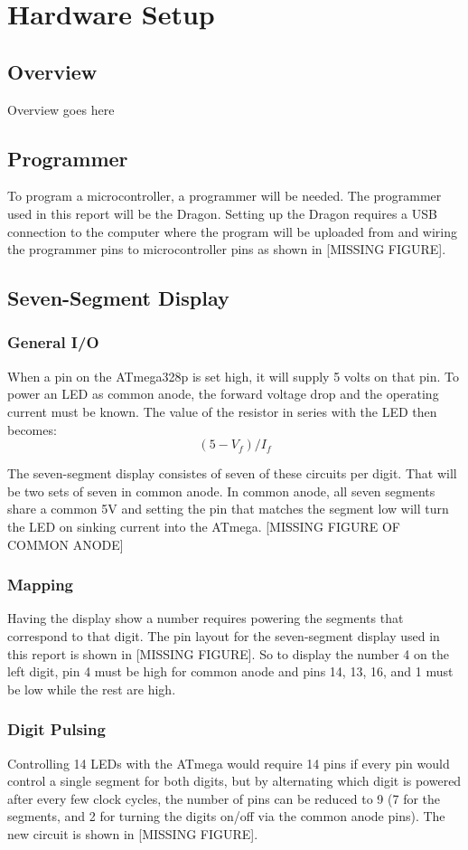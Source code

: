 \documentclass[main.tex]{subfiles}
\begin{document}
\chapter{Hardware Setup}
	\section{Overview}
	Overview goes here
	
	\section{Programmer}
	To program a microcontroller, a programmer will be needed. The programmer used in this report
	will be the Dragon. Setting up the Dragon requires a USB connection to the computer where
	the program will be uploaded from and wiring the programmer pins to microcontroller pins
	as shown in [MISSING FIGURE].
	
	\section{Seven-Segment Display}
		\subsection{General I/O}
		When a pin on the ATmega328p is set high, it will supply 5 volts on that pin. To power an
		LED as common anode, the forward voltage drop and the operating current must be known.
		The value of the resistor in series with the LED then becomes: \[(5 - V_f)/I_f\]
		
		The seven-segment display consistes of seven of these circuits per digit. That will be two sets
		of seven in common anode. In common anode, all seven segments share a common 5V and setting the
		pin that matches the segment low will turn the LED on sinking current into the ATmega.
		[MISSING FIGURE OF COMMON ANODE]
		
		\subsection{Mapping}
		Having the display show a number requires powering the segments that correspond to that digit.
		The pin layout for the seven-segment display used in this report is shown in [MISSING FIGURE].
		So to display the number 4 on the left digit, pin 4 must be high for common anode and pins
		14, 13, 16, and 1 must be low while the rest are high.
		
		\subsection{Digit Pulsing}
		Controlling 14 LEDs with the ATmega would require 14 pins if every pin would control a single
		segment for both digits, but by alternating which digit is powered after every few clock cycles,
		the number of pins can be reduced to 9 (7 for the segments, and 2 for turning the digits on/off
		via the common anode pins). The new circuit is shown in [MISSING FIGURE]. 
		
\end{document}
